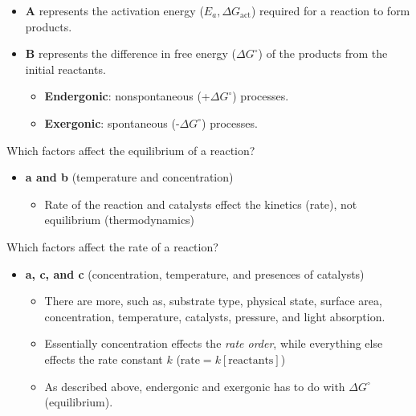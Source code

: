 \documentclass[12pt,a4paper]{article}
\begin{document}
\begin{enumerate}
\begin{itemize}
            \begin{itemize}
                \item \textbf{A} represents the activation energy (\(E_a, \Delta G_{\text{act}}\)) required for a reaction to form products.
                \item \textbf{B} represents the difference in free energy (\(\Delta G^\circ\)) of the products from the initial reactants.
                    \begin{itemize}
                        \item {\color{pos}\textbf{Endergonic}}: {\color{o-Sun}nonspontaneous} ({\color{pos}+\(\Delta G^\circ\)}) processes.
                        \item {\color{neg}\textbf{Exergonic}}: {\color{o-Sun}spontaneous} ({\color{neg}-\(\Delta G^\circ\)}) processes.
                    \end{itemize}
            \end{itemize}
        \end{itemize}
    {\color{G-Moon}\item Which factors affect the equilibrium of a reaction?}
        \begin{itemize}
            \item {\color{o-Sun}\textbf{a and b} (temperature and concentration)} 
            \begin{itemize}
                \item Rate of the reaction and catalysts effect the kinetics (rate), not equilibrium (thermodynamics)
            \end{itemize}
        \end{itemize}
    \newpage
    {\color{G-Moon}\item Which factors affect the rate of a reaction?}
        \begin{itemize}
            \item {\color{o-Sun}\textbf{a, c, and c} (concentration, temperature, and presences of catalysts)} 
            \begin{itemize}
                \item There are more, such as, substrate type, physical state, surface area, concentration, temperature, catalysts, pressure, and light absorption. 
                \item Essentially concentration effects the \textit{rate order}, while everything else effects the rate constant \(k\) (\(\text{rate} = k[\text{reactants}]\))
                \item As described above, endergonic and exergonic has to do with \(\Delta G^\circ\) (equilibrium).

\end{itemize}
\end{itemize}
\end{enumerate}
\end{document}
